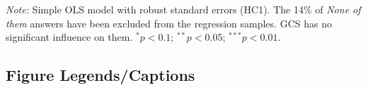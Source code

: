 \documentclass[12pt,english]{article}
\begin{document}
\begin{table}[h]
  \caption[Influence of the GCS on electoral prospects]{Preference for a progressive platform depending on whether it includes the GCS or not. (Question 28) %
} %
  \makebox[\textwidth][c]{
  }\label{tab:conjoint_c}
  {\footnotesize \textit{Note:} Simple OLS model with robust standard errors (HC1). %
  The 14\% of \textit{None of them} answers have been excluded from the regression samples. GCS has no significant influence on them. $^{*}p<0.1$; $^{**} p<0.05$; $^{***} p<0.01$. 
  }
\end{table}

\subsection*{Figure Legends/Captions}
\end{document}
